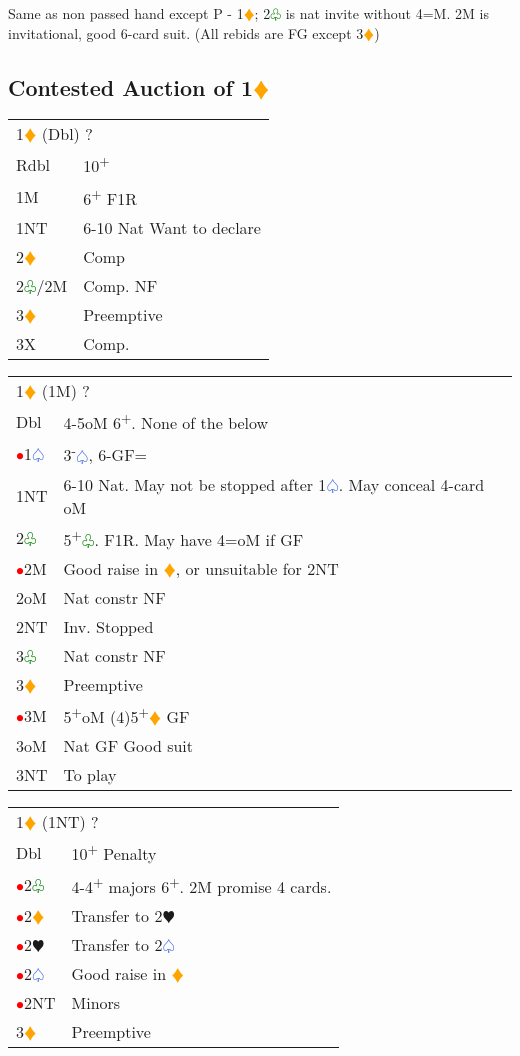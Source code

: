 \documentclass{article}
\renewcommand{\sp}{\textcolor{RoyalBlue}{$\varspade$}}
\newcommand{\he}{\textcolor{RubineRed}{$\varheart$}}
\newcommand{\di}{\textcolor{Orange}{$\vardiamond$}}
\newcommand{\cl}{\textcolor{Green}{$\varclub$}}
\newcommand{\nt}{\relsize{-1}NT\relsize{1}}
\newcommand{\up}{\textsuperscript{+}}
\newcommand{\down}{\textsuperscript{-}}
\newcommand{\al}{\textcolor{red}{$\bullet$}}
\begin{document}
Same as non passed hand except P - 1\di{}; 2\cl{} is nat invite without 4=M. 2M is invitational, good 6-card suit. (All rebids are FG except 3\di{})

\subsection{Contested Auction of 1\di{}}

\begin{tabular}{|l|p{6.5cm}}
	\multicolumn{2}{l}{1\di{} (Dbl) ?}\\
	Rdbl & 10\up \\
	1M & 6\up{} F1R \\
	1\nt{} & 6-10 Nat Want to declare \\
	2\di{} & Comp \\
	2\cl{}/2M & Comp. NF \\
	3\di{} & Preemptive \\
	3X & Comp. \\
\end{tabular}

\medskip

\begin{tabular}{|l|p{6.5cm}}
	\multicolumn{2}{l}{1\di{} (1M) ?}\\
	Dbl & 4-5oM{} 6\up. None of the below \\
	\al{}1\sp{} & 3\down\sp{}, 6-GF= \\
	1\nt & 6-10 Nat. May not be stopped after 1\sp{}. May conceal 4-card oM \\
	2\cl{} & 5\up{}\cl{}. F1R. May have 4=oM if GF \\ 
	\al{}2M & Good raise in \di{}, or unsuitable for 2\nt{} \\
	2oM & Nat constr NF \\
	2\nt{} & Inv. Stopped \\
	3\cl{} & Nat constr NF \\
	3\di{} & Preemptive \\
	\al{}3M & 5\up{}oM (4)5\up{}\di{} GF \\
	3oM & Nat GF Good suit \\
	3\nt{} & To play
\end{tabular}

\medskip

\begin{tabular}{|l|p{6.5cm}}
	\multicolumn{2}{l}{1\di{} (1\nt{}) ?}\\
	Dbl & 10\up{} Penalty \\
	\al{}2\cl{} & 4-4\up{} majors 6\up{}. 2M promise 4 cards. \\
	\al{}2\di{} & Transfer to 2\he{} \\
	\al{}2\he{} & Transfer to 2\sp{} \\
	\al{}2\sp{} & Good raise in \di{} \\
	\al{}2\nt{} & Minors \\
	3\di{} & Preemptive \\
\end{tabular}
\end{document}
